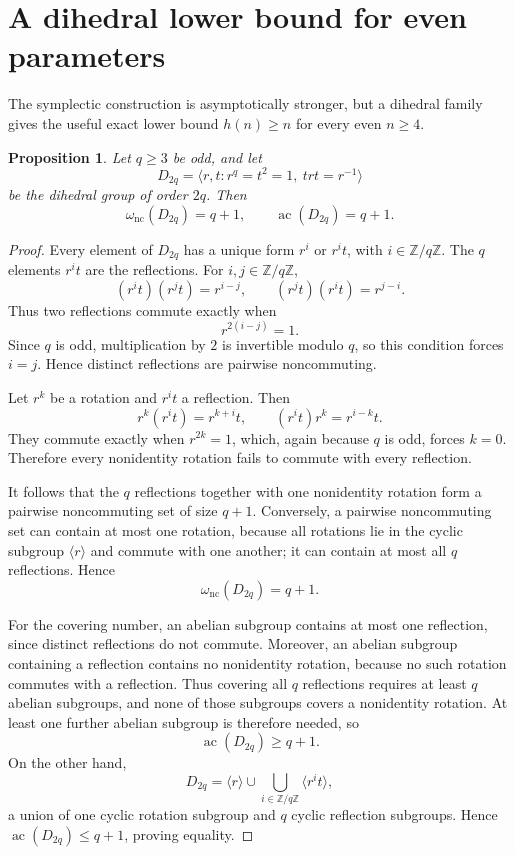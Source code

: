 \documentclass[11pt]{article}
\newtheorem{proposition}[theorem]{Proposition}
\theoremstyle{definition}
\newcommand{\Z}{\mathbb{Z}}
\newcommand{\nc}{\omega_{\mathrm{nc}}}
\newcommand{\ac}{\operatorname{ac}}
\begin{document}
\section{A dihedral lower bound for even parameters}

The symplectic construction is asymptotically stronger, but a dihedral family gives the useful exact lower bound $h(n)\ge n$ for every even $n\ge4$.

\begin{proposition}\label{prop:dihedral}
Let $q\ge3$ be odd, and let
\[
 D_{2q}=\langle r,t:r^q=t^2=1,\ trt=r^{-1}\rangle
\]
be the dihedral group of order $2q$.  Then
\[
 \nc(D_{2q})=q+1,
 \qquad
 \ac(D_{2q})=q+1.
\]
\end{proposition}

\begin{proof}
Every element of $D_{2q}$ has a unique form $r^i$ or $r^it$, with $i\in\Z/q\Z$.  The $q$ elements $r^it$ are the reflections.  For $i,j\in\Z/q\Z$,
\[
 (r^it)(r^jt)=r^{i-j},
 \qquad
 (r^jt)(r^it)=r^{j-i}.
\]
Thus two reflections commute exactly when
\[
 r^{2(i-j)}=1.
\]
Since $q$ is odd, multiplication by $2$ is invertible modulo $q$, so this condition forces $i=j$.  Hence distinct reflections are pairwise noncommuting.

Let $r^k$ be a rotation and $r^it$ a reflection.  Then
\[
 r^k(r^it)=r^{k+i}t,
 \qquad
 (r^it)r^k=r^{i-k}t.
\]
They commute exactly when $r^{2k}=1$, which, again because $q$ is odd, forces $k=0$.  Therefore every nonidentity rotation fails to commute with every reflection.

It follows that the $q$ reflections together with one nonidentity rotation form a pairwise noncommuting set of size $q+1$.  Conversely, a pairwise noncommuting set can contain at most one rotation, because all rotations lie in the cyclic subgroup $\langle r\rangle$ and commute with one another; it can contain at most all $q$ reflections.  Hence
\[
 \nc(D_{2q})=q+1.
\]

For the covering number, an abelian subgroup contains at most one reflection, since distinct reflections do not commute.  Moreover, an abelian subgroup containing a reflection contains no nonidentity rotation, because no such rotation commutes with a reflection.  Thus covering all $q$ reflections requires at least $q$ abelian subgroups, and none of those subgroups covers a nonidentity rotation.  At least one further abelian subgroup is therefore needed, so
\[
 \ac(D_{2q})\ge q+1.
\]
On the other hand,
\[
 D_{2q}=\langle r\rangle\cup\bigcup_{i\in\Z/q\Z}\langle r^it\rangle,
\]
a union of one cyclic rotation subgroup and $q$ cyclic reflection subgroups.  Hence $\ac(D_{2q})\le q+1$, proving equality.
\end{proof}
\end{document}
